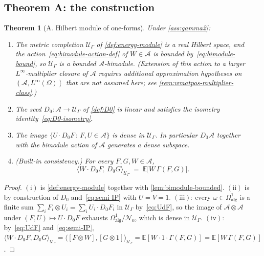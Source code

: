 \documentclass[11pt,reqno]{amsart}
\theoremstyle{plain}
\newtheorem{theorem}{Theorem}[section]
\theoremstyle{definition}
\theoremstyle{remark}
\newcommand{\E}{\mathbb{E}}
\newcommand{\cA}{\mathcal A}
\newcommand{\cU}{\mathcal U}
\begin{document}
\subsection{Theorem A: the construction}\label{sec:moduleA-thmA}

\begin{theorem}[A. Hilbert module of one-forms]\label{thm:A}
Under \cref{ass:gamma2}:
\begin{enumerate}
\item[$(\mathrm i)$] The metric completion
$\cU_{\Gamma}$ of \cref{def:energy-module} is a real Hilbert
space, and the action~\eqref{eq:bimodule-action-def}
of $W\in\cA$ is bounded
by~\eqref{eq:bimodule-bound}, so $\cU_{\Gamma}$ is a bounded
$\cA$-bimodule. (Extension of this action to a larger
$L^{\infty}$-multiplier closure of $\cA$ requires additional
approximation hypotheses on $(\cA,L^{\infty}(\Omega))$ that are
not assumed here; see
\cref{rem:wmatpos-multiplier-class}.)
\item[$(\mathrm{ii})$] The seed
$D_{0}\colon\cA\to\cU_{\Gamma}$ of \cref{def:D0} is linear and
satisfies the isometry identity~\eqref{eq:D0-isometry}.
\item[$(\mathrm{iii})$] The image $\{U\cdot D_{0}F\,:\,F,U\in\cA\}$
is dense in $\cU_{\Gamma}$. In particular $D_{0}\cA$ together
with the bimodule action of $\cA$ generates a dense subspace.
\item[$(\mathrm{iv})$] (Built-in consistency.) For every
$F,G,W\in\cA$,
\begin{equation}\label{eq:Linf-consistency}
  \langle W\cdot D_{0}F,\,D_{0}G\rangle_{\cU_{\Gamma}}
  \;=\;\E\!\bigl[W\,\Gamma(F,G)\bigr].
\end{equation}
\end{enumerate}
\end{theorem}

\begin{proof}
$(\mathrm i)$ is \cref{def:energy-module} together with
\cref{lem:bimodule-bounded}. $(\mathrm{ii})$ is by construction
of $D_{0}$ and~\eqref{eq:semi-IP} with $U=V=1$.
$(\mathrm{iii})$: every $\omega\in\Omega^{1}_{\mathrm{alg}}$ is
a finite sum $\sum_{i}F_{i}\otimes U_{i}=\sum_{i}U_{i}\cdot D_{0}F_{i}$
in $\cU_{\Gamma}$ by~\eqref{eq:UdF}, so the image of
$\cA\otimes\cA$ under $(F,U)\mapsto U\cdot D_{0}F$ exhausts
$\Omega^{1}_{\mathrm{alg}}/\mathcal N_{0}$, which is dense in
$\cU_{\Gamma}$.
$(\mathrm{iv})$: by~\eqref{eq:UdF} and~\eqref{eq:semi-IP},
$\langle W\cdot D_{0}F,D_{0}G\rangle_{\cU_{\Gamma}}
=\langle[F\otimes W],[G\otimes 1]\rangle_{\cU_{\Gamma}}
=\E[W\cdot 1\cdot\Gamma(F,G)]=\E[W\,\Gamma(F,G)]$.
\end{proof}
\end{document}
